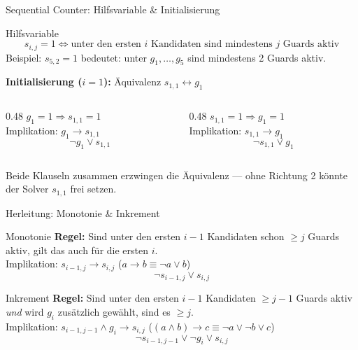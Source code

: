 \documentclass[11pt,aspectratio=169]{beamer}
\newcommand{\guard}[1]{g_{#1}}
\newcommand{\svar}[2]{s_{#1,#2}}
\begin{document}
\begin{frame}{Sequential Counter: Hilfsvariable \& Initialisierung}
  \begin{block}{Hilfsvariable}
    \[
      \svar{i}{j} = 1 \iff \text{unter den ersten } i \text{ Kandidaten sind mindestens } j \text{ Guards aktiv}
    \]
    \small Beispiel: $\svar{5}{2}=1$ bedeutet: unter $\guard{1},\ldots,\guard{5}$ sind mindestens 2 Guards aktiv.
  \end{block}
  \vspace{0.5em}
  \textbf{Initialisierung ($i=1$):} Äquivalenz $\svar{1}{1} \leftrightarrow \guard{1}$
  \vspace{0.3em}
  \begin{columns}[T]
    \begin{column}{0.48\textwidth}
      \small $\guard{1}=1 \Rightarrow \svar{1}{1}=1$\\
      Implikation: $\guard{1} \to \svar{1}{1}$
      \[
        \neg\guard{1} \vee \svar{1}{1}
      \]
    \end{column}
    \begin{column}{0.48\textwidth}
      \small $\svar{1}{1}=1 \Rightarrow \guard{1}=1$\\
      Implikation: $\svar{1}{1} \to \guard{1}$
      \[
        \neg\svar{1}{1} \vee \guard{1}
      \]
    \end{column}
  \end{columns}
  \vspace{0.3em}
  \small Beide Klauseln zusammen erzwingen die Äquivalenz —
  ohne Richtung 2 könnte der Solver $\svar{1}{1}$ frei setzen.
\end{frame}

\begin{frame}{Herleitung: Monotonie \& Inkrement}
  \begin{block}{Monotonie}
    \textbf{Regel:} Sind unter den ersten $i{-}1$ Kandidaten schon $\geq j$ Guards aktiv,
    gilt das auch für die ersten $i$.\\[0.2em]
    Implikation: $\svar{i-1}{j} \rightarrow \svar{i}{j}$
    \quad($a \to b \equiv \neg a \vee b$)
    \[
      \neg\svar{i-1}{j} \vee \svar{i}{j}
    \]
  \end{block}
  \begin{block}{Inkrement}
    \textbf{Regel:} Sind unter den ersten $i{-}1$ Kandidaten $\geq j{-}1$ Guards aktiv
    \emph{und} wird $\guard{i}$ zusätzlich gewählt, sind es $\geq j$.\\[0.2em]
    Implikation: $\svar{i-1}{j-1} \wedge \guard{i} \rightarrow \svar{i}{j}$
    \quad($(a{\wedge}b){\to}c \equiv \neg a \vee \neg b \vee c$)
    \[
      \neg\svar{i-1}{j-1} \vee \neg\guard{i} \vee \svar{i}{j}
    \]
  \end{block}
\end{frame}
\end{document}
